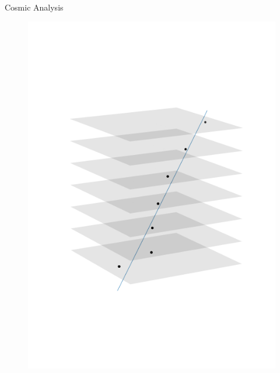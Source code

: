 \documentclass{beamer}
\begin{document}
\begin{frame}[fragile]{Cosmic Analysis}
\begin{minipage}{.32\textwidth}
\begin{figure}[H]
	    \includegraphics[trim=0 80 0 80,clip,width=\textwidth]{example_112000.png}
	\end{figure}
    \end{minipage}
    \begin{minipage}{.32\textwidth}
	\begin{figure}[H]
	    \centering

\end{figure}
\end{minipage}
\end{frame}
\end{document}
